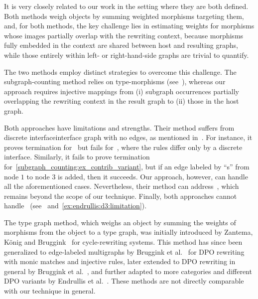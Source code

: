 It is very closely related to our work in the setting where they are both defined. Both methods weigh objects by summing weighted morphisms targeting them, and, for both methods, the key challenge lies in estimating weights for morphisms whose images partially overlap with the rewriting context, because morphisms fully embedded in the context are shared between host and resulting graphs, while those entirely within left- or right-hand-side graphs are trivial to quantify.  

The two methods employ distinct strategies to overcome this challenge. The subgraph-counting method relies on type-morphisms (see~\cite[page 9, remark 4.11, Lemma 4.23]{overbeek2024termination_lmcs}), whereas our approach requires injective mappings from (i) subgraph occurrences partially overlapping the rewriting context in the result graph to (ii) those in the host graph.

Both approaches have limitations and strengths. Their method suffers from discrete interface\textemdash interface graph with no edges, as mentioned in~\cite[Example 5.5]{overbeek2024termination_lmcs}. For instance, it proves termination for~\cite[Example 5.5]{overbeek2024termination_lmcs} but fails for~\cite[Example 6.3]{endrullis2024generalized_arxiv_v2}, where the rules differ only by a discrete interface. 
Similarly, it fails to prove termination for~\autoref{subgraph_counting:ex_contrib_variant}, but if an edge labeled by ``s'' from node $1$ to node $3$ is added, then it succeeds. Our approach, however, can handle all the aforementioned cases. Nevertheless, their method can address~\cite[Example 4.1]{plump1995ontermination}, which remains beyond the scope of our technique. Finally, both approaches cannot handle~\cite[Example D.3]{endrullis2024generalized_arxiv_v2} (see~\cite[Remark 6.2]{overbeek2024termination_lmcs} and~\autoref{ex:endrullis:d3:limitation}).

The type graph method, which weighs an object by summing the weights of morphisms from the object to a type graph, was initially introduced by Zantema, K{\"o}nig and Bruggink~\cite{zantema2014termination} for cycle-rewriting systems. 
This method has since been generalized to edge-labeled multigraphs by Bruggink et al.~\cite{bruggink2014termination} for DPO rewriting with monic matches and injective rules, later extended to DPO rewriting in general by Bruggink et al.~\cite{bruggink2015proving}, and further adapted to more categories and different DPO variants by Endrullis et al.~\cite{endrullis2024generalized_arxiv_v2}. 
These methods are not directly comparable with our technique in general.

